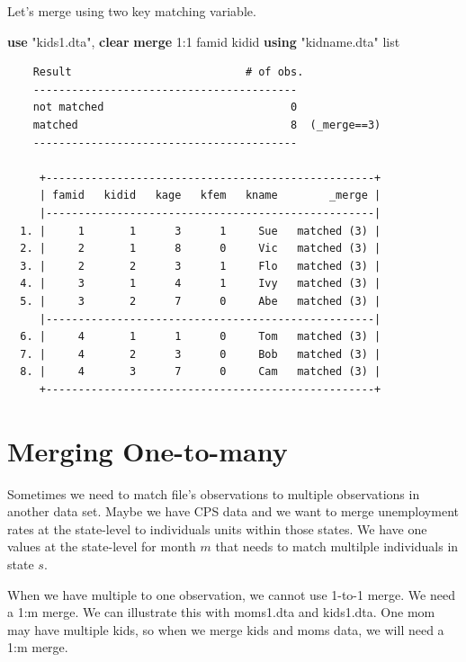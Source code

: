 \documentclass[
]{book}
\newenvironment{Shaded}{\begin{snugshade}}{\end{snugshade}}
\newcommand{\KeywordTok}[1]{\textcolor[rgb]{0.13,0.29,0.53}{\textbf{#1}}}
\newcommand{\NormalTok}[1]{#1}
\newcommand{\OtherTok}[1]{\textcolor[rgb]{0.56,0.35,0.01}{#1}}
\newcommand{\StringTok}[1]{\textcolor[rgb]{0.31,0.60,0.02}{#1}}
\begin{document}
Let's merge using two key matching variable.

\begin{Shaded}
\begin{Highlighting}[]
\KeywordTok{use} \StringTok{"kids1.dta"}\NormalTok{, }\KeywordTok{clear}
\KeywordTok{merge}\NormalTok{ 1:1 famid kidid }\KeywordTok{using} \StringTok{"kidname.dta"}
\OtherTok{list}
\end{Highlighting}
\end{Shaded}

\begin{verbatim}
    Result                           # of obs.
    -----------------------------------------
    not matched                             0
    matched                                 8  (_merge==3)
    -----------------------------------------

     +---------------------------------------------------+
     | famid   kidid   kage   kfem   kname        _merge |
     |---------------------------------------------------|
  1. |     1       1      3      1     Sue   matched (3) |
  2. |     2       1      8      0     Vic   matched (3) |
  3. |     2       2      3      1     Flo   matched (3) |
  4. |     3       1      4      1     Ivy   matched (3) |
  5. |     3       2      7      0     Abe   matched (3) |
     |---------------------------------------------------|
  6. |     4       1      1      0     Tom   matched (3) |
  7. |     4       2      3      0     Bob   matched (3) |
  8. |     4       3      7      0     Cam   matched (3) |
     +---------------------------------------------------+
\end{verbatim}

\section{Merging One-to-many}\label{merging-one-to-many}

Sometimes we need to match file's observations to multiple observations in another data set. Maybe we have CPS data and we want to merge unemployment rates at the state-level to individuals units within those states. We have one values at the state-level for month \(m\) that needs to match multilple individuals in state \(s\).

When we have multiple to one observation, we cannot use 1-to-1 merge. We need a 1:m merge.
We can illustrate this with moms1.dta and kids1.dta. One mom may have multiple kids, so when we merge kids and moms data, we will need a 1:m merge.
\end{document}
